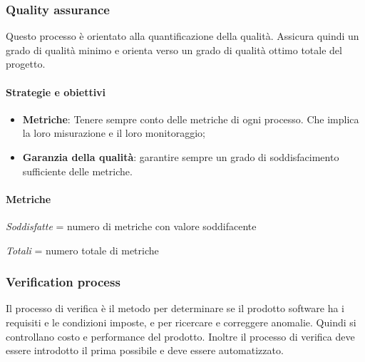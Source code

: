                     
            \subsubsection{Quality assurance}
            Questo processo è orientato alla quantificazione della qualità. Assicura quindi un grado di qualità minimo e orienta verso un grado di qualità ottimo totale del progetto.
            
            \paragraph{Strategie e obiettivi}
            \begin{itemize}
                \item \textbf{Metriche}: Tenere sempre conto delle metriche di ogni processo. Che implica la loro misurazione e il loro monitoraggio;
                \item \textbf{Garanzia della qualità}: garantire sempre un grado di soddisfacimento sufficiente delle metriche.
            \end{itemize}
            
            \paragraph{Metriche}
            \hphantom{}
            \def\productquality{
                {   Percentuale di metriche soddisfatte,
                    $\frac{Soddisfatte}{Totali}$,
                    $ \geq 60 \%$,
                    $ \geq 80 \% $
                },
            }
            
            
\textit{Soddisfatte} = numero di metriche con valore soddifacente

\textit{Totali} = numero totale di metriche
 
            \newpage
            \subsubsection{Verification process}
            Il processo di verifica è il metodo per determinare se il prodotto software ha i requisiti e le condizioni imposte, e per ricercare e correggere anomalie. Quindi si controllano costo e performance del prodotto. Inoltre il processo di verifica deve essere introdotto il prima possibile e deve essere automatizzato.
            
